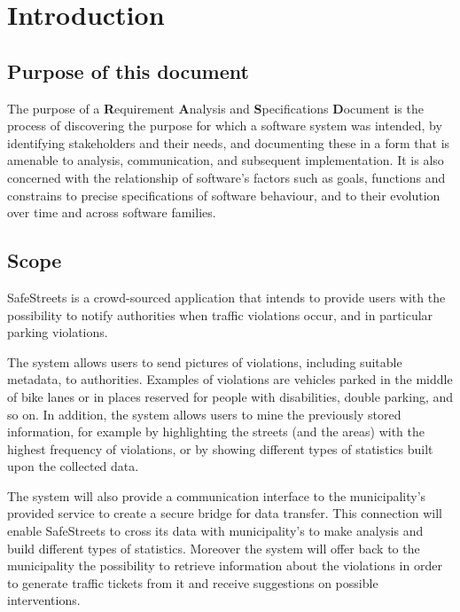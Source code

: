 \setlength{\parindent}{4ex}
\setlength{\parskip}{1ex}

\section{Introduction}
\subsection{Purpose of this document}
The purpose of a \textbf{R}equirement \textbf{A}nalysis and \textbf{S}pecifications \textbf{D}ocument is the process of discovering the purpose for which a software system was intended, by identifying stakeholders and their needs, and documenting these in a form that is amenable to analysis, communication, and subsequent implementation. \cite{RE} It is also concerned with the relationship of software's factors such as goals, functions and constrains to precise specifications of software behaviour, and to their evolution over time and across software families. \cite{Zave}

\subsection{Scope}

	SafeStreets is a crowd-­sourced application that intends to provide users with the possibility to notify authorities when traffic violations occur, and in particular parking violations. 
	
	The system allows users to send pictures of violations, including suitable metadata, to authorities. Examples of violations are vehicles parked in the middle of bike lanes or in places reserved for people with disabilities, double parking, and so on. In addition, the system allows users to mine the previously stored information, for example by highlighting the streets (and the areas) with the highest frequency of violations, or by showing different types of statistics built upon the collected data.
	
	The system will also provide a communication interface to the municipality's provided service to create a secure bridge for data transfer. This connection will enable SafeStreets to cross its data with municipality's to make analysis and build different types of statistics. Moreover the system will offer back to the municipality the possibility to retrieve information about the violations in order to generate traffic tickets from it and receive suggestions on possible interventions. \cite{Assignments}
	
